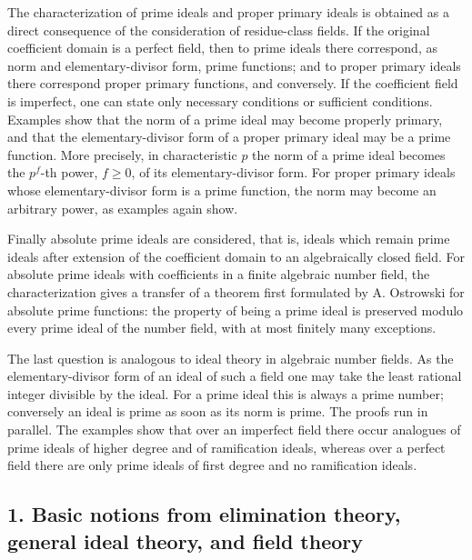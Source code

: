 \documentclass[12pt]{article}
\begin{document}
The characterization of prime ideals and proper primary ideals is obtained as a direct consequence of the consideration of residue-class fields. If the original coefficient domain is a perfect field, then to prime ideals there correspond, as norm and elementary-divisor form, prime functions; and to proper primary ideals there correspond proper primary functions, and conversely. If the coefficient field is imperfect, one can state only necessary conditions or sufficient conditions. Examples show that the norm of a prime ideal may become properly primary, and that the elementary-divisor form of a proper primary ideal may be a prime function. More precisely, in characteristic $p$ the norm of a prime ideal becomes the $p^f$-th power, $f\geq 0$, of its elementary-divisor form. For proper primary ideals whose elementary-divisor form is a prime function, the norm may become an arbitrary power, as examples again show.

Finally absolute prime ideals are considered, that is, ideals which remain prime ideals after extension of the coefficient domain to an algebraically closed field. For absolute prime ideals with coefficients in a finite algebraic number field, the characterization gives a transfer of a theorem first formulated by A. Ostrowski for absolute prime functions: the property of being a prime ideal is preserved modulo every prime ideal of the number field, with at most finitely many exceptions.

The last question is analogous to ideal theory in algebraic number fields. As the elementary-divisor form of an ideal of such a field one may take the least rational integer divisible by the ideal. For a prime ideal this is always a prime number; conversely an ideal is prime as soon as its norm is prime. The proofs run in parallel. The examples show that over an imperfect field there occur analogues of prime ideals of higher degree and of ramification ideals, whereas over a perfect field there are only prime ideals of first degree and no ramification ideals.

\subsection{1. Basic notions from elimination theory, general ideal theory, and field theory}
\end{document}
